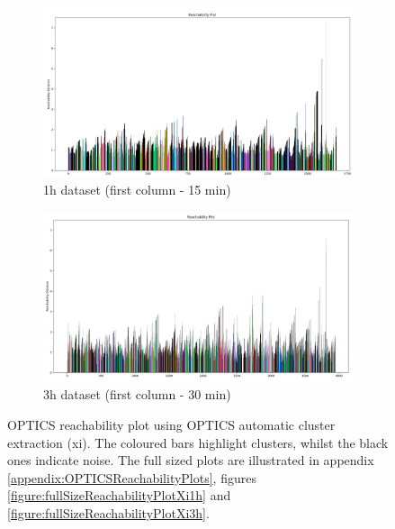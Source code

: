 \begin{figure}[H]
  \centering
  \begin{subfigure}{.5\textwidth}\captionsetup{width=.8\linewidth}
    \centering
    \includegraphics[width=1\textwidth]{./images/OPTICS/1h-1-reachabilityPlot-xi.png}
  \caption{1h dataset (first column - 15 min)}
  \end{subfigure}%
  \begin{subfigure}{.5\textwidth}\captionsetup{width=.8\linewidth}
    \centering
    \includegraphics[width=1\textwidth]{./images/OPTICS/3h-1-reachabilityPlot-xi.png}
    \caption{3h dataset (first column - 30 min)}
  \end{subfigure}
  \caption{OPTICS reachability plot using OPTICS automatic cluster extraction (xi). The coloured bars highlight clusters, whilst the black ones indicate noise. The full sized plots are illustrated in appendix \ref{appendix:OPTICSReachabilityPlots}, figures \ref{figure:fullSizeReachabilityPlotXi1h} and \ref{figure:fullSizeReachabilityPlotXi3h}.}
  \label{figure:OPTICSXiResultsReachabilityPlot}
  \end{figure}

